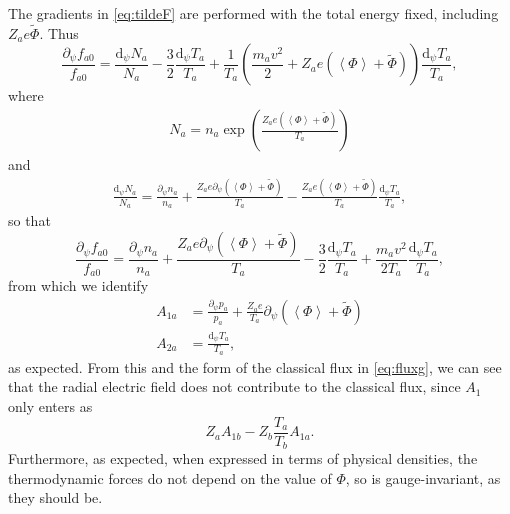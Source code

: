\documentclass[12pt, a4paper]{article}
\newcommand{\p}{\ensuremath{\partial}}
\renewcommand{\d}{\ensuremath{\mathrm{d}}}
\newcommand{\lang}{\left\langle}
\newcommand{\rang}{\right\rangle}
\begin{document}
The gradients in \eqref{eq:tildeF} are performed with the total energy fixed, including $Z_a e\tilde{\Phi}$. Thus
\begin{equation}
 \frac{\p_\psi f_{a0}}{f_{a0}} = \frac{\d_\psi N_a}{N_a} - \frac{3}{2}\frac{\d_\psi T_a}{T_a} + \frac{1}{T_a}\left(\frac{m_a v^2}{2} + Z_a e (\lang \Phi \rang + \tilde{\Phi})\right) \frac{\d_\psi T_a}{T_a}, \label{eq:dpsifM2}
\end{equation}
where
\begin{align}
  N_a = n_a \exp{\left(\frac{Z_a e(\lang \Phi \rang + \tilde{\Phi})}{T_a} \right)}
\end{align}
and
\begin{align}
  \frac{\d_\psi N_a}{N_a} = \frac{\p_\psi n_a}{n_a} + \frac{Z_a e \p_\psi (\lang \Phi \rang + \tilde{\Phi})}{T_a} - \frac{Z_a e (\lang \Phi \rang + \tilde{\Phi})}{T_a} \frac{\d_\psi T_a}{T_a},
\end{align}
so that
\begin{equation}
\frac{\p_\psi f_{a0}}{f_{a0}} = \frac{\p_\psi n_a}{n_a} + \frac{Z_a e \p_\psi (\lang \Phi \rang + \tilde{\Phi})}{T_a} - \frac{3}{2}\frac{\d_\psi T_a}{T_a} + \frac{m_a v^2}{2T_a}  \frac{\d_\psi T_a}{T_a},
\end{equation}
from which we identify
\begin{align}
  A_{1a} &= \frac{\p_\psi p_a}{p_a} + \frac{Z_a e}{T_a} \p_\psi (\lang \Phi \rang + \tilde{\Phi}) \\
  A_{2a} &= \frac{\d_\psi T_a}{T_a},
\end{align}
as expected. From this and the form of the classical flux in \eqref{eq:fluxg}, we can see that the radial electric field does not contribute to the classical flux, since $A_{1}$ only enters as
\begin{equation}
Z_a A_{1b} - Z_b \frac{T_a}{T_b} A_{1a}.
\end{equation}
Furthermore, as expected, when expressed in terms of physical densities, the thermodynamic forces do not depend on the value of $\Phi$, so is gauge-invariant, as they should be. 
\end{document}
